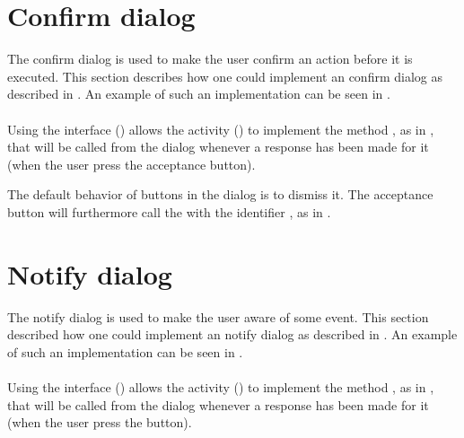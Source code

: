 \section{Confirm dialog}
\label{sec:impl_confirm_dialog}

The confirm dialog is used to make the user confirm an action before it is executed. This section describes how one could implement an confirm dialog as described in . An example of such an implementation can be seen in .
\\\\
Using the  interface () allows the activity () to implement the method , as in , that will be called from the dialog whenever a response has been made for it (when the user press the acceptance button).  



\noindent
The default behavior of buttons in the dialog is to dismiss it. The acceptance button will furthermore call the  with the identifier , as in .

\section{Notify dialog}
\label{sec:impl_notify_dialog}

The notify dialog is used to make the user aware of some event. This section described how one could implement an notify dialog as described in . An example of such an implementation can be seen in .
\\\\
Using the  interface () allows the activity () to implement the method , as in , that will be called from the dialog whenever a response has been made for it (when the user press the button).  

